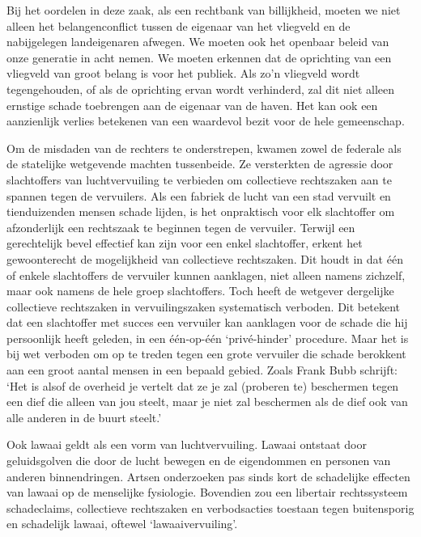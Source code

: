 \documentclass[
  a5paper,
  smalldemyvopaper,10pt,twoside,onecolumn,openright,extrafontsizes,hidelinks]{memoir}
\renewenvironment{quote}%
               {\list{}{\rightmargin=.6cm\leftmargin=.6cm}%
                \itshape \item[]}%
               {\endlist}
\begin{document}
\begin{quote}
Bij het oordelen in deze zaak, als een rechtbank van billijkheid, moeten
we niet alleen het belangenconflict tussen de eigenaar van het vliegveld
en de nabijgelegen landeigenaren afwegen. We moeten ook het openbaar
beleid van onze generatie in acht nemen. We moeten erkennen dat de
oprichting van een vliegveld van groot belang is voor het publiek. Als
zo'n vliegveld wordt tegengehouden, of als de oprichting ervan wordt
verhinderd, zal dit niet alleen ernstige schade toebrengen aan de
eigenaar van de haven. Het kan ook een aanzienlijk verlies betekenen van
een waardevol bezit voor de hele gemeenschap.
\end{quote}

Om de misdaden van de rechters te onderstrepen, kwamen zowel de federale
als de statelijke wetgevende machten tussenbeide. Ze versterkten de
agressie door slachtoffers van luchtvervuiling te verbieden om
collectieve rechtszaken aan te spannen tegen de vervuilers. Als een
fabriek de lucht van een stad vervuilt en tienduizenden mensen schade
lijden, is het onpraktisch voor elk slachtoffer om afzonderlijk een
rechtszaak te beginnen tegen de vervuiler. Terwijl een gerechtelijk
bevel effectief kan zijn voor een enkel slachtoffer, erkent het
gewoonterecht de mogelijkheid van collectieve rechtszaken. Dit houdt in
dat één of enkele slachtoffers de vervuiler kunnen aanklagen, niet
alleen namens zichzelf, maar ook namens de hele groep slachtoffers. Toch
heeft de wetgever dergelijke collectieve rechtszaken in vervuilingszaken
systematisch verboden. Dit betekent dat een slachtoffer met succes een
vervuiler kan aanklagen voor de schade die hij persoonlijk heeft
geleden, in een één-op-één `privé-hinder' procedure. Maar het is bij wet
verboden om op te treden tegen een grote vervuiler die schade berokkent
aan een groot aantal mensen in een bepaald gebied. Zoals Frank Bubb
schrijft: `Het is alsof de overheid je vertelt dat ze je zal (proberen
te) beschermen tegen een dief die alleen van jou steelt, maar je niet
zal beschermen als de dief ook van alle anderen in de buurt steelt.'

Ook lawaai geldt als een vorm van luchtvervuiling. Lawaai ontstaat door
geluidsgolven die door de lucht bewegen en de eigendommen en personen
van anderen binnendringen. Artsen onderzoeken pas sinds kort de
schadelijke effecten van lawaai op de menselijke fysiologie. Bovendien
zou een libertair rechtssysteem schadeclaims, collectieve rechtszaken en
verbodsacties toestaan tegen buitensporig en schadelijk lawaai, oftewel
`lawaaivervuiling'.
\end{document}
